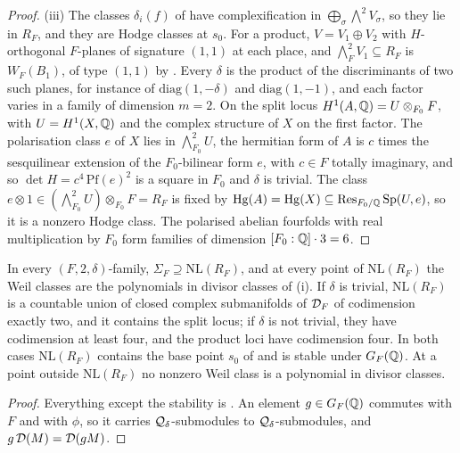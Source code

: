 \begin{proof}
(iii) The classes $\delta_{i}(f)$ of \cite[Theorem~17.5(ii)]{paperI} have
complexification in $\bigoplus_{\sigma}\bigwedge^{2}V_{\sigma}$, so they lie in
$R_{F}$, and they are Hodge classes at $s_{0}$. For a product,
$V=V_{1}\oplus V_{2}$ with $H$-orthogonal $F$-planes of signature $(1,1)$ at
each place, and $\bigwedge^{2}_{F}V_{1}\subseteq R_{F}$ is $W_{F}(B_{1})$, of
type $(1,1)$ by \cite[Proposition~17.3(i)]{paperI}. Every $\delta$ is the product of the
discriminants of two such planes, for instance of $\mathrm{diag}(1,-\delta)$
and $\mathrm{diag}(1,-1)$, and each factor varies in a family of dimension
$m=2$. On the split locus $H^{1}(A,\mathbb{Q})=U\otimes_{F_{0}}F$, with
$U=H^{1}(X,\mathbb{Q})$ and the complex structure of $X$ on the first factor. The
polarisation class $e$ of $X$ lies in $\bigwedge^{2}_{F_{0}}U$, the hermitian
form of $A$ is $c$ times the sesquilinear extension of the $F_{0}$-bilinear
form $e$, with $c\in F$ totally imaginary, and so $\det H=c^{4}\,\mathrm{Pf}(e)^{2}$
is a square in $F_{0}$ and $\delta$ is trivial. The class
$e\otimes1\in(\bigwedge^{2}_{F_{0}}U)\otimes_{F_{0}}F=R_{F}$ is fixed by
$\operatorname{Hg}(A)=\operatorname{Hg}(X)\subseteq\operatorname{Res}_{F_{0}/\mathbb{Q}}\operatorname{Sp}(U,e)$, so it is a nonzero Hodge
class. The polarised abelian fourfolds with real multiplication by $F_{0}$
form families of dimension $[F_{0}:\mathbb{Q}]\cdot3=6$.
\end{proof}

\begin{corollary}\label{cor:quarticbase}
In every $(F,2,\delta)$-family, $\Sigma_{F}\supseteq\mathrm{NL}(R_{F})$, and at
every point of $\mathrm{NL}(R_{F})$ the Weil classes are the polynomials in
divisor classes of (i). If $\delta$ is trivial,
$\mathrm{NL}(R_{F})$ is a countable union of closed complex submanifolds of
$\mathcal{D}_{F}$ of codimension exactly two, and it contains the split locus; if
$\delta$ is not trivial, they have codimension at least four, and the product
loci have codimension four. In both cases $\mathrm{NL}(R_{F})$ contains the
base point $s_{0}$ of \cite[Theorem~17.5]{paperI} and is stable under
$G_{F}(\mathbb{Q})$. At a point outside $\mathrm{NL}(R_{F})$ no nonzero Weil class is
a polynomial in divisor classes.
\end{corollary}

\begin{proof}
Everything except the stability is . An element
$g\in G_{F}(\mathbb{Q})$ commutes with $F$ and with $\phi$, so it carries
$\mathcal{Q}_{\delta}$-submodules to $\mathcal{Q}_{\delta}$-submodules, and
$g\,\mathcal{D}(M)=\mathcal{D}(gM)$.
\end{proof}

